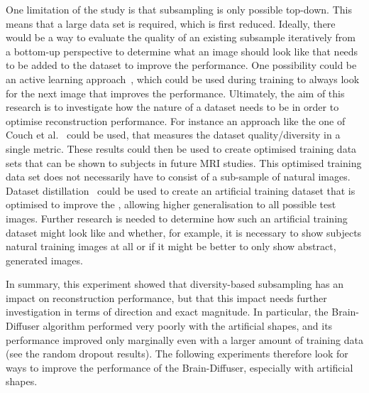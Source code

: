One limitation of the study is that subsampling is only possible top-down. This means that a large data set is required, which is first reduced. Ideally, there would be a way to evaluate the quality of an existing subsample iteratively from a bottom-up perspective  to determine what an image should look like that needs to be added to the dataset to improve the performance. One possibility could be an active learning approach~\cite{senerActiveLearningConvolutional2018, guoDeepCoreComprehensiveLibrary2022}, which could be used during training to always look for the next image that improves the performance. Ultimately, the aim of this research is to investigate how the nature of a dataset needs to be in order to optimise reconstruction performance. For instance an approach like the one of Couch et al.~\cite{couchSizeClassBalance2024} could be used, that measures the dataset quality/diversity in a single metric. These results could then be used to create optimised training data sets that can be shown to subjects in future MRI studies. This optimised training data set does not necessarily have to consist of a sub-sample of natural images. Dataset distillation~\cite{wangDatasetDistillation2018,yuDatasetDistillationComprehensive2024} could be used to create an artificial training dataset that is optimised to improve the , allowing higher generalisation to all possible test images. Further research is needed to determine how such an artificial training dataset might look like and whether, for example, it is necessary to show subjects natural training images at all or if it might be better to only show abstract, generated images. 

In summary, this experiment showed that diversity-based subsampling has an impact on reconstruction performance, but that this impact needs further investigation in terms of direction and exact magnitude. In particular, the Brain-Diffuser algorithm performed very poorly with the artificial shapes, and its  performance improved only marginally even with a larger amount of training data (see the random dropout results). The following experiments therefore look for ways to improve the performance of the Brain-Diffuser, especially with artificial shapes.
